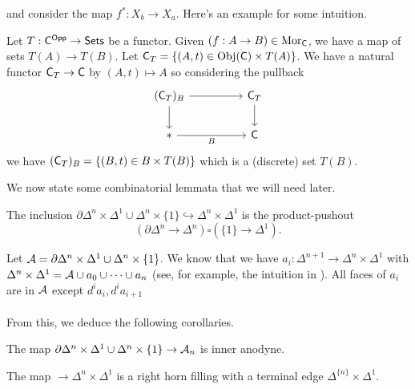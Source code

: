 and consider the map $f^{*}:X_{b}\to X_{a}$. Here's an example for some intuition. 
\begin{example}
    Let $T:\mathsf{C}^{\mathsf{Opp}}\to\mathsf{Sets}$ be a functor. Given $(f:A\to B)\in\mathrm{Mor}_{\mathsf{C}}$, we have a map of sets $T(A)\to T(B)$. Let $\mathsf{C}_{T}=\{(A,t)\in\mathrm{Obj}(\mathsf{C})\times T(A)\}$. We have a natural functor $\mathsf{C}_{T}\to\mathsf{C}$ by $(A,t)\mapsto A$ so considering the pullback 
    $$%
    \begin{tikzcd}
        {(\Csf_{T})_{B}} && {\Csf_{T}} \\
        {*} && \Csf
        \arrow[from=1-1, to=2-1]
        \arrow[from=1-3, to=2-3]
        \arrow["B"', from=2-1, to=2-3]
        \arrow[from=1-1, to=1-3]
    \end{tikzcd}$$
    we have $(\mathsf{C}_{T})_{B}=\{(B,t)\in B\times T(B)\}$ which is a (discrete) set $T(B)$.
\end{example}
We now state some combinatorial lemmata that we will need later. 
\begin{lemma}\label{lem: box product of Deltan x Delta1}
    The inclusion $\partial\Delta^{n}\times\Delta^{1}\cup\Delta^{n}\times\{1\}\hookrightarrow\Delta^{n}\times\Delta^{1}$ is the product-pushout $$(\partial\Delta^{n}\to\Delta^{n})\square(\{1\}\to\Delta^{1}).$$
\end{lemma}
Let $\mathcal{A}=\partial\Delta^{n}\times\Delta^{1}\cup\Delta^{n}\times\{1\}$. We know that we have $a_{i}:\Delta^{n+1}\to\Delta^{n}\times\Delta^{1}$ with $\Delta^{n}\times\Delta^{1}=\mathcal{A}\cup a_{0}\cup\dots\cup a_{n}$ (see, for example, the intuition in ). All faces of $a_{i}$ are in $\mathcal{A}$ except $d^{i}a_{i}, d^{i}a_{i+1}$
\\\\
From this, we deduce the following corollaries. 
\begin{corollary}\label{corr: A to An is inner anodyne}
    The map $\partial\Delta^{n}\times\Delta^{1}\cup\Delta^{n}\times\{1\}\to \mathcal{A}_{n}$ is  inner anodyne. 
\end{corollary}
\begin{corollary}\label{corr: An to Deltan x Delta1 is right horn fill}
    The map $\to\Delta^{n}\times\Delta^{1}$ is a right horn filling with a terminal edge $\Delta^{\{n\}}\times\Delta^{1}$. 
\end{corollary}
